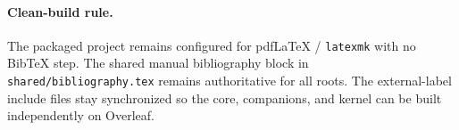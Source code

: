 \paragraph{Clean-build rule.}
The packaged project remains configured for pdf\LaTeX{} / \texttt{latexmk} with no Bib\TeX{} step. The shared manual bibliography block in \texttt{shared/bibliography.tex} remains authoritative for all roots. The external-label include files stay synchronized so the core, companions, and kernel can be built independently on Overleaf.
